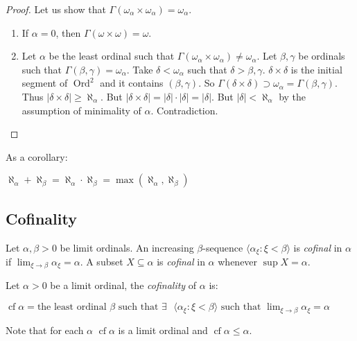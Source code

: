 \documentclass[8pt]{article}
\theoremstyle{definition}
\theoremstyle{definition}
\theoremstyle{definition}
\theoremstyle{definition}
\theoremstyle{definition}
\theoremstyle{definition}
\theoremstyle{definition}
\theoremstyle{definition}
\theoremstyle{definition}
\theoremstyle{definition}
\theoremstyle{definition}
\theoremstyle{definition}
\theoremstyle{definition}
\theoremstyle{definition}
\theoremstyle{question}
\begin{document}
\begin{proof}
  Let us show that $\Gamma(\omega_{\alpha} \times \omega_{\alpha}) = \omega_{\alpha}$. 
  \begin{enumerate}
    \item If $\alpha = 0$, then $\Gamma(\omega \times \omega) = \omega$.
    \item Let $\alpha$ be the least ordinal such that $\Gamma(\omega_{\alpha} \times \omega_{\alpha}) \neq \omega_{\alpha}$.
    Let $\beta, \gamma$ be ordinals such that $\Gamma(\beta, \gamma) = \omega_{\alpha}$.
    Take $\delta < \omega_{\alpha}$ such that $\delta > \beta, \gamma$. 
    $\delta \times \delta$ is the initial segment of $\operatorname{Ord}^2$ and it contains $(\beta, \gamma)$. 
    So $\Gamma(\delta \times \delta) \supset \omega_{\alpha} = \Gamma(\beta, \gamma)$.
    Thus $|\delta \times \delta| \geq \aleph_{\alpha}$. 
    But $|\delta \times \delta| = |\delta| \cdot |\delta| = |\delta|$. But $|\delta| < \aleph_{\alpha}$ by the assumption 
    of minimality of $\alpha$. Contradiction.
  \end{enumerate}
\end{proof}

As a corollary:
\begin{center}
  $\aleph_{\alpha} + \aleph_{\beta} = \aleph_{\alpha} \cdot \aleph_{\beta} = \max(\aleph_{\alpha}, \aleph_{\beta})$
\end{center}

\subsection{Cofinality}

Let $\alpha, \beta > 0$ be limit ordinals. An increasing $\beta$-sequence 
$\langle \alpha_{\xi} : \xi < \beta \rangle$ is \emph{cofinal} in $\alpha$ if $\lim_{\xi \to \beta} \alpha_{\xi} = \alpha$.
A subset $X \subseteq \alpha$ is \emph{cofinal} in $\alpha$ whenever $\sup X = \alpha$.

Let $\alpha > 0$ be a limit ordinal, the \emph{cofinality} of $\alpha$ is:
\begin{center}
  $\operatorname{cf} \alpha = \text{the least ordinal $\beta$ such that $\exists$ 
  $\langle \alpha_{\xi} : \xi < \beta \rangle$ such that $\lim_{\xi \to \beta} \alpha_{\xi} = \alpha$}$
\end{center}

  Note that for each $\alpha$ $\operatorname{cf} \alpha$ is a limit ordinal and $\operatorname{cf} \alpha \leq \alpha$.
\end{document}
